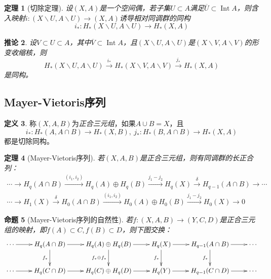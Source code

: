 \documentclass[UTF-8,11pt,fancyhdr,hyperref,titlepage]{ctexart}
\newcommand{\red}{\color{red}}
\theoremstyle{question}
\theoremstyle{theorem}
\newtheorem{thm}{定理}
\newtheorem{cor}[thm]{推论}
\newtheorem{prop}[thm]{命题}
\theoremstyle{definition}
\newtheorem{defn}[thm]{定义}
\theoremstyle{remark}
\def\longto{\longrightarrow}
\def\To{\longto}
\newcommand{\markar}[1]{\stackrel{{#1}}{\longrightarrow}}%
\DeclareMathOperator{\Int}{Int}
\begin{document}
\begin{thm}[{{\red 切除定理}}]
  设$(X,A)$是一个空间偶，若子集$U\subset A$满足$\overline{U}\subset\Int A$，则含入映射$i\colon(X\backslash U, A\backslash U)\To(X, A)$诱导相对同调群的同构
  \begin{equation*}
    i_{\ast}\colon H_{\ast}(X\backslash U,A\backslash U)\To H_{\ast}(X, A)
  \end{equation*}
\end{thm}
\begin{cor}
  设$V\subset U\subset A$，其中$\overline{V}\subset\Int A$，且$(X\backslash U, A\backslash U)$是$(X\backslash V, A\backslash V)$的形变收缩核，则
  \begin{equation*}
    H_{\ast}(X\backslash U, A\backslash U)\markar{i_{\ast}}H_{\ast}(X\backslash V, A\backslash V)\markar{j_{\ast}}H_{\ast}(X,A)
  \end{equation*}
  是同构。
\end{cor}

\subsection{Mayer-Vietoris序列}
\begin{defn}
  称$(X,A,B)$为\emph{\red 正合三元组}，如果$A\cup B=X$，且
  \begin{equation*}
    i_{\ast}\colon H_{\ast}(A, A\cap B)\To H_{\ast}(X,B),\  j_{\ast}\colon H_{\ast}(B,A\cap B)\To H_{\ast}(X,A)
  \end{equation*}
  都是切除同构。
\end{defn}
\begin{thm}[{{\red Mayer-Vietoris序列}}]
  若$(X,A,B)$是正合三元组，则有同调群的长正合列：
  \begin{multline*}
    \cdots\To H_q(A\cap B)\markar{(i_1,i_2)}H_q(A)\oplus H_q(B)\markar{j_1-j_2}H_q(X)\markar{\delta}H_{q-1}(A\cap B)\To\cdots \\
    \cdots\To H_1(X)\markar{\delta}H_0(A\cap B)\markar{(i_1,i_2)}H_0(A)\oplus H_0(B)\markar{j_1-j_2}H_0(X)\To 0
  \end{multline*}
\end{thm}
\begin{prop}[{{\red Mayer-Vietoris序列的自然性}}]
  若$f\colon(X,A,B)\To(Y,C,D)$是正合三元组的映射，即$f(A)\subset C, f(B)\subset D$，则下图交换：
  \begin{displaymath}
  \xymatrix{
    \cdots \ar[r] & H_q(A\cap B) \ar[d]_{f_{\ast}} \ar[r] & H_q(A)\oplus H_q(B) \ar[d]_{f_{\ast}\oplus f_{\ast}} \ar[r] & H_q(X) \ar[d]_{f_{\ast}} \ar[r] & H_{q-1}(A\cap B) \ar[d]_{f_{\ast}} \ar[r] & \cdots \\
    \cdots \ar[r] & H_q(C\cap D) \ar[r] & H_q(C)\oplus H_q(D) \ar[r] & H_q(Y) \ar[r] & H_{q-1}(C\cap D) \ar[r] & \cdots   }
  \end{displaymath}
\end{prop}
\end{document}
